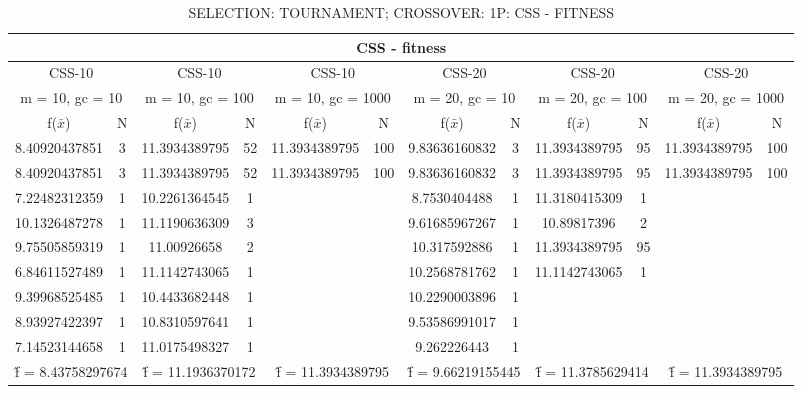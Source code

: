 \begin{table}[H]
	\centering
	\caption{SELECTION: TOURNAMENT; CROSSOVER: 1P: CSS - FITNESS}
	\begin{adjustbox}{width=1\textwidth}
		\begin{tabular}{ |c|c||c|c||c|c||c|c||c|c||c|c| }
			\hline
			\multicolumn{12}{|c|}{CSS - fitness} \\
			\hline
			\multicolumn{2}{|c||}{CSS-10} & \multicolumn{2}{c||}{CSS-10} & \multicolumn{2}{c||}{CSS-10} & \multicolumn{2}{c||}{CSS-20} & \multicolumn{2}{c||}{CSS-20} & \multicolumn{2}{c|}{CSS-20}\\
			\hline
			\multicolumn{2}{|c||}{m = 10, gc = 10} & \multicolumn{2}{c||}{m = 10, gc = 100} & \multicolumn{2}{c||}{m = 10, gc = 1000} & \multicolumn{2}{c||}{m = 20, gc = 10} & \multicolumn{2}{c||}{m = 20, gc = 100} & \multicolumn{2}{c|}{m = 20, gc = 1000}\\
			\hline
			f($\bar{x}$) & N & f($\bar{x}$) & N & f($\bar{x}$) & N & f($\bar{x}$) & N & f($\bar{x}$) & N & f($\bar{x}$) & N\\
			\hline
			\hline
			8.40920437851 & 3 & 11.3934389795 & 52 & 11.3934389795 & 100 & 9.83636160832 & 3 & 11.3934389795 & 95 & 11.3934389795 & 100\\
			\hline
			8.40920437851 & 3 & 11.3934389795 & 52 & 11.3934389795 & 100 & 9.83636160832 & 3 & 11.3934389795 & 95 & 11.3934389795 & 100\\
			7.22482312359 & 1 & 10.2261364545 & 1 &   &   & 8.7530404488 & 1 & 11.3180415309 & 1 &   &  \\
			10.1326487278 & 1 & 11.1190636309 & 3 &   &   & 9.61685967267 & 1 & 10.89817396 & 2 &   &  \\
			9.75505859319 & 1 & 11.00926658 & 2 &   &   & 10.317592886 & 1 & 11.3934389795 & 95 &   &  \\
			6.84611527489 & 1 & 11.1142743065 & 1 &   &   & 10.2568781762 & 1 & 11.1142743065 & 1 &   &  \\
			9.39968525485 & 1 & 10.4433682448 & 1 &   &   & 10.2290003896 & 1 &   &   &   &  \\
			8.93927422397 & 1 & 10.8310597641 & 1 &   &   & 9.53586991017 & 1 &   &   &   &  \\
			7.14523144658 & 1 & 11.0175498327 & 1 &   &   & 9.262226443 & 1 &   &   &   &  \\
			\hline
			\multicolumn{2}{|c||}{\^{f} = 8.43758297674} & \multicolumn{2}{c||}{\^{f} = 11.1936370172} & \multicolumn{2}{c||}{\^{f} = 11.3934389795} & \multicolumn{2}{c||}{\^{f} = 9.66219155445} & \multicolumn{2}{c||}{\^{f} = 11.3785629414} & \multicolumn{2}{c|}{\^{f} = 11.3934389795}\\
			\hline
		\end{tabular}
	\end{adjustbox}
\end{table}

